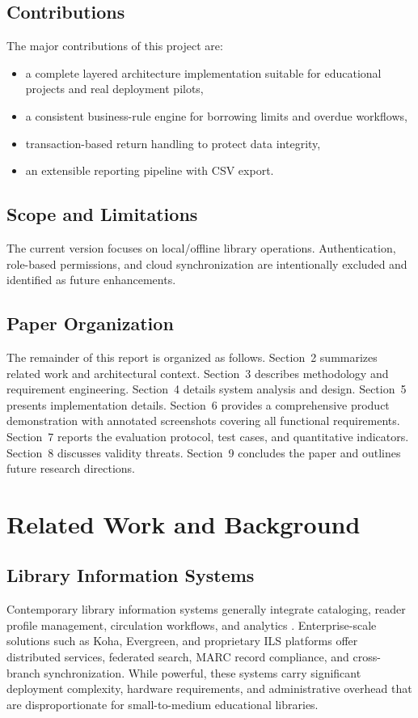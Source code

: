 \documentclass[12pt,a4paper]{article}
\begin{document}
\subsection{Contributions}
The major contributions of this project are:
\begin{itemize}[leftmargin=1.5cm]
    \item a complete layered architecture implementation suitable for educational projects and real deployment pilots,
    \item a consistent business-rule engine for borrowing limits and overdue workflows,
    \item transaction-based return handling to protect data integrity,
    \item an extensible reporting pipeline with CSV export.
\end{itemize}

\subsection{Scope and Limitations}
The current version focuses on local/offline library operations. Authentication, role-based permissions, and cloud synchronization are intentionally excluded and identified as future enhancements.

\subsection{Paper Organization}
The remainder of this report is organized as follows. Section~2 summarizes related work and architectural context. Section~3 describes methodology and requirement engineering. Section~4 details system analysis and design. Section~5 presents implementation details. Section~6 provides a comprehensive product demonstration with annotated screenshots covering all functional requirements. Section~7 reports the evaluation protocol, test cases, and quantitative indicators. Section~8 discusses validity threats. Section~9 concludes the paper and outlines future research directions.

\section{Related Work and Background}
\subsection{Library Information Systems}
Contemporary library information systems generally integrate cataloging, reader profile management, circulation workflows, and analytics \cite{pressman}. Enterprise-scale solutions such as Koha, Evergreen, and proprietary ILS platforms offer distributed services, federated search, MARC record compliance, and cross-branch synchronization. While powerful, these systems carry significant deployment complexity, hardware requirements, and administrative overhead that are disproportionate for small-to-medium educational libraries.
\end{document}
